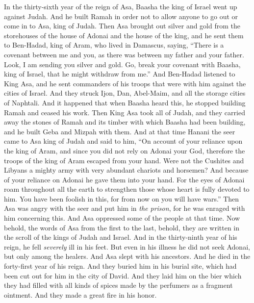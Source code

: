 \begin{biblechapter} %
 In the thirty-sixth year of the reign of Asa, Baasha the king of Israel went up against Judah. And he built Ramah in order not to allow anyone to go out or come in to Asa, king of Judah.
\verse Then Asa brought out silver and gold from the storehouses of the house of Adonai and the house of the king, and he sent them to Ben-Hadad, king of Aram, who lived in Damascus, saying,
\verse “There is a covenant between me and you, as there was between my father and your father. Look, I am sending you silver and gold. Go, break your covenant with Baasha, king of Israel, that he might withdraw from me.”
\verse And Ben-Hadad listened to King Asa, and he sent commanders of his troops that were with him against the cities of Israel. And they struck Ijon, Dan, Abel-Maim, and all the storage cities of Naphtali.
\verse And it happened that when Baasha heard this, he stopped building Ramah and ceased his work.
\verse Then King Asa took all of Judah, and they carried away the stones of Ramah and its timber with which Baasha had been building, and he built Geba and Mizpah with them.
\verse And at that time Hanani the seer came to Asa king of Judah and said to him, “On account of your reliance upon the king of Aram, and since you did not rely on Adonai your God, therefore the troops of the king of Aram escaped from your hand.
\verse Were not the Cushites and Libyans a mighty army with very abundant chariots and horsemen? And because of your reliance on Adonai he gave them into your hand.
\verse For the eyes of Adonai roam throughout all the earth to strengthen those whose heart is fully devoted to him. You have been foolish in this, for from now on you will have wars.”
\verse Then Asa was angry with the seer and put him in \textit{the prison}, for he was enraged with him concerning this. And Asa oppressed some of the people at that time.
\verse Now behold, the words of Asa from the first to the last, behold, they are written in the scroll of the kings of Judah and Israel.
\verse And in the thirty-ninth year of his reign, he fell \textit{severely} ill in his feet. But even in his illness he did not seek Adonai, but only among the healers.
\verse And Asa slept with his ancestors. And he died in the forty-first year of his reign.
\verse And they buried him in his burial site, which had been cut out for him in the city of David. And they laid him on the bier which they had filled with all kinds of spices made by the perfumers as a fragment ointment. And they made a great fire in his honor.
\end{biblechapter}

